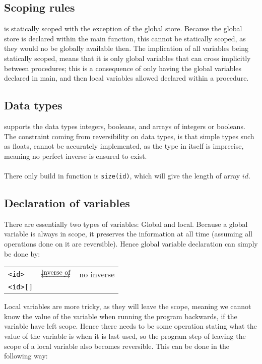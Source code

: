 \subsection{Scoping rules \rr}
\lan is statically scoped with the exception of the global store. Because the global store is
declared within the main function, this cannot be statically scoped, as they would no be globally
available then. The implication of all variables being statically scoped, means that it is only
global variables that can cross implicitly between procedures; this is a consequence of only
having the global variables declared in main, and then local variables allowed declared within a
procedure.

\subsection{Data types \rr}
\lan supports the data types integers, booleans, and arrays of integers or booleans.
The constraint coming from reversibility on data types, is that simple types such as floats,
cannot be accurately implemented, as the type in itself is imprecise, meaning no perfect inverse
is ensured to exist.
\\
\\
There only build in function is \texttt{size(id)}, which will give the length of array $id$.

\subsection{Declaration of variables \rr}
There are essentially two types of variables: Global and local. Because a global variable is
always in scope, it preserves the information at all time (assuming all operations done on it
are reversible). Hence global variable declaration can simply be done by:

\begin{table*}[h]
    \centering
    \begin{tabular}{lcl}
        \texttt{<id>} & $\underleftrightarrow{\text{Inverse of}}$ & no inverse \\
        \texttt{<id>[]}
    \end{tabular}
\end{table*}
\noindent
Local variables are more tricky, as they will leave the scope, meaning we cannot know the value
of the variable when running the program backwards, if the variable have left scope. Hence there
needs to be some operation stating what the value of the variable is when it is last used, so
the program step of leaving the scope of a local variable also becomes reversible. This can be
done in the following way:

